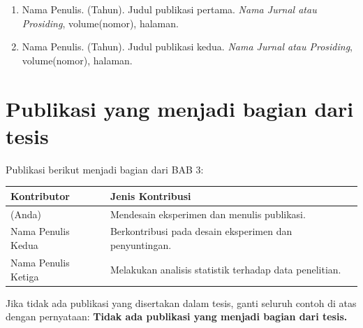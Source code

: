 

\begin{enumerate}
  \item Nama Penulis. (Tahun). Judul publikasi pertama. \textit{Nama Jurnal atau Prosiding}, volume(nomor), halaman.
  \item Nama Penulis. (Tahun). Judul publikasi kedua. \textit{Nama Jurnal atau Prosiding}, volume(nomor), halaman.
\end{enumerate}

\section*{Publikasi yang menjadi bagian dari tesis}


Publikasi berikut menjadi bagian dari BAB 3:

\noindent\begin{tabularx}{\textwidth}{|Y|Y|}
  \hline
  \textbf{Kontributor} & \textbf{Jenis Kontribusi} \\
  \hline
  \namaMahasiswa{} (Anda) & Mendesain eksperimen dan menulis publikasi. \\
  \hline
  Nama Penulis Kedua & Berkontribusi pada desain eksperimen dan penyuntingan. \\
  \hline
  Nama Penulis Ketiga & Melakukan analisis statistik terhadap data penelitian. \\
  \hline
\end{tabularx}

\vspace{6mm}
\noindent Jika tidak ada publikasi yang disertakan dalam tesis, ganti seluruh contoh di atas dengan pernyataan: \textbf{Tidak ada publikasi yang menjadi bagian dari tesis.}
